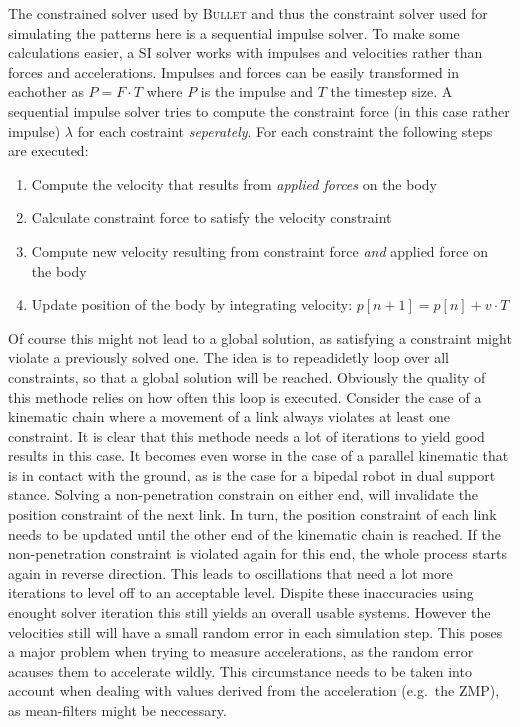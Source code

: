 \documentclass[english,ngerman]{KITreprt}
\newcommand{\name}[1]{\textsc{#1}}
\begin{document}
The constrained solver used by \name{Bullet} and thus the constraint
solver used for simulating the patterns here is a sequential impulse
solver. To make some calculations easier, a SI solver works with
impulses and velocities rather than forces and accelerations. Impulses
and forces can be easily transformed in eachother as $P = F \cdot T$
where $P$ is the impulse and $T$ the timestep size. A sequential impulse
solver tries to compute the constraint force (in this case rather
impulse) $\lambda$ for each costraint \emph{seperately}. For each
constraint the following steps are executed:

\begin{enumerate}
\def\labelenumi{\arabic{enumi}.}
\itemsep1pt\parskip0pt
\item
  Compute the velocity that results from \emph{applied forces} on the
  body
\item
  Calculate constraint force to satisfy the velocity constraint
\item
  Compute new velocity resulting from constraint force \emph{and}
  applied force on the body
\item
  Update position of the body by integrating velocity:
  $p[n+1] = p[n] + v \cdot T$
\end{enumerate}

Of course this might not lead to a global solution, as satisfying a
constraint might violate a previously solved one. The idea is to
repeadidetly loop over all constraints, so that a global solution will
be reached. Obviously the quality of this methode relies on how often
this loop is executed. Consider the case of a kinematic chain where a
movement of a link always violates at least one constraint. It is clear
that this methode needs a lot of iterations to yield good results in
this case. It becomes even worse in the case of a parallel kinematic
that is in contact with the ground, as is the case for a bipedal robot
in dual support stance. Solving a non-penetration constrain on either
end, will invalidate the position constraint of the next link. In turn,
the position constraint of each link needs to be updated until the other
end of the kinematic chain is reached. If the non-penetration constraint
is violated again for this end, the whole process starts again in
reverse direction. This leads to oscillations that need a lot more
iterations to level off to an acceptable level. Dispite these
inaccuracies using enought solver iteration this still yields an overall
usable systems. However the velocities still will have a small random
error in each simulation step. This poses a major problem when trying to
measure accelerations, as the random error acauses them to accelerate
wildly. This circumstance needs to be taken into account when dealing
with values derived from the acceleration (e.g.~the ZMP), as
mean-filters might be neccessary.
\end{document}

